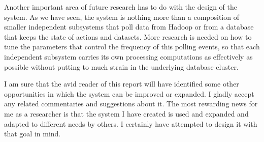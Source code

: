 Another important area of future research has to do with the design of the system. As we have seen, the system is nothing more than a composition of smaller independent subsystems that poll data from Hadoop or from a database that keeps the state of actions and datasets.  More research is needed on how to tune the parameters that control the frequency of this polling events, so that each independent subsystem carries its own processing computations as effectively as possible without putting to much strain in the underlying database cluster.

I am sure that the avid reader of this report will have identified some other opportunities in which the system can be improved or expanded. I gladly accept any related commentaries and suggestions about it. The most rewarding news for me as a researcher is that the system I have created is used and expanded and adapted to different needs by others. I certainly have attempted to design it with that goal in mind.